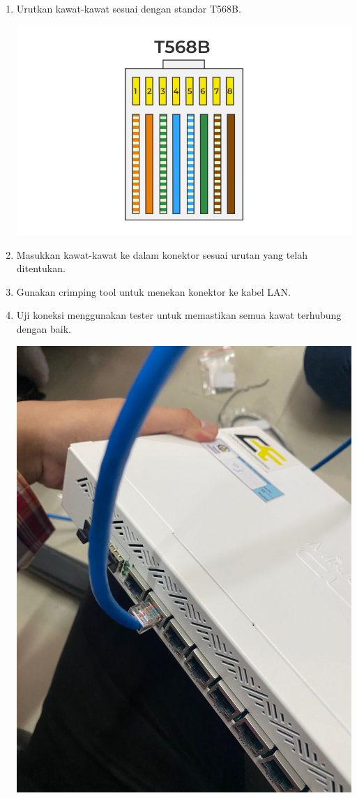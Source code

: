 \begin{enumerate}
\begin{enumerate}
\begin{center}
        \end{center}
        \item Urutkan kawat-kawat sesuai dengan standar T568B.
        \begin{center}
		    \includegraphics[scale=0.4]{P1/img/crimping.png}
        \end{center}
        \item Masukkan kawat-kawat ke dalam konektor sesuai 
        urutan yang telah ditentukan.
        \item Gunakan crimping tool untuk menekan konektor ke 
        kabel LAN.
        \item Uji koneksi menggunakan tester untuk memastikan 
        semua kawat terhubung dengan baik.
        \begin{center}
		    \includegraphics[scale=0.1]{P1/img/1-6.jpg}

\end{center}
\end{enumerate}
\end{enumerate}
